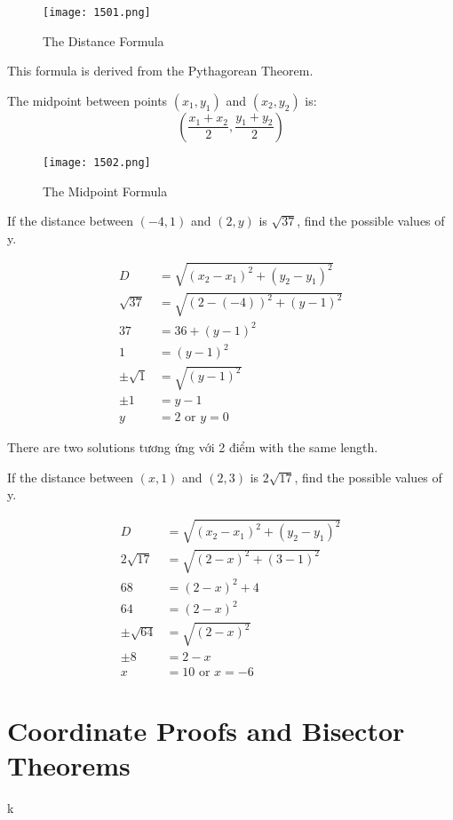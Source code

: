 \newpage

\begin{figure}[htb!]
  \centering
  \texttt{[image: 1501.png]}
  \caption{The Distance Formula}
\end{figure}

This formula is derived from the Pythagorean Theorem.

\vspace{.5cm}

\begin{tcolorbox}[enhanced,attach boxed title to top center={yshift=-3mm,yshifttext=-1mm},
  colback=blue!5!white,colframe=blue!75!black,colbacktitle=red!80!black,
  title=The Midpoint Formula,fonttitle=\bfseries,
  boxed title style={size=small,colframe=red!50!black} ]
  The midpoint between points $(x_{1},y_{1})$ and $(x_{2},y_{2})$ is:
  \[\left(\frac{x_{1}+x_{2}}{2},\frac{y_{1}+y_{2}}{2}\right)\]
\end{tcolorbox}

\begin{figure}[htb!]
  \centering
  \texttt{[image: 1502.png]}
  \caption{The Midpoint Formula}
\end{figure}

\newpage

 If the distance between $(-4,1)$ and $(2,y)$ is $\sqrt{37}$, find the possible values of y.

\begin{align*} 
  D&=\sqrt{(x_{2}-x_{1})^{2}+(y_{2}-y_{1})^{2}}\\ 
  \sqrt{37}&=\sqrt{(2-(-4))^{2}+(y-1)^{2}}\\
  37&=36+(y-1)^{2}\\
  1&=(y-1)^{2}\\
  \pm\sqrt{1}&=\sqrt{(y-1)^{2}}\\
  \pm1&=y-1\\
  y&=2 \text{ or } y=0
\end{align*}

There are two solutions tương ứng với 2 điểm with the same length.

\vspace{.7cm}

 If the distance between $(x,1)$ and $(2,3)$ is $2\sqrt{17}$, find the possible values of y.

\begin{align*} 
  D&=\sqrt{(x_{2}-x_{1})^{2}+(y_{2}-y_{1})^{2}}\\ 
  2\sqrt{17}&=\sqrt{(2-x)^{2}+(3-1)^{2}}\\
  68&=(2-x)^{2}+4\\
  64&=(2-x)^{2}\\
  \pm\sqrt{64}&=\sqrt{(2-x)^{2}}\\
  \pm8&=2-x\\
  x&=10 \text{ or } x=-6
\end{align*}

\section{Coordinate Proofs and Bisector Theorems}

k
